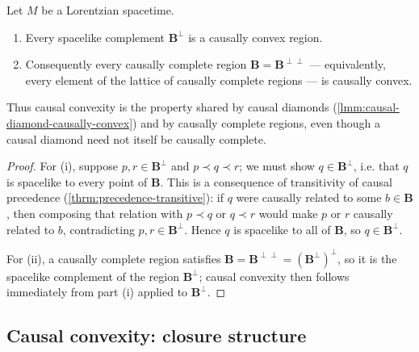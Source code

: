 \begin{theorem}
    \label{thrm:causally-complete-convex}
    \leanok
    Let $M$ be a Lorentzian spacetime.
    \begin{enumerate}
        \item Every spacelike complement $\mathbf{B}^\perp$ is a causally convex region.
        \item Consequently every causally complete region $\mathbf{B} = \mathbf{B}^{\perp\perp}$ — equivalently, every element of the lattice of causally complete regions — is causally convex.
    \end{enumerate}
    Thus causal convexity is the property shared by causal diamonds (\ref{lmm:causal-diamond-causally-convex}) and by causally complete regions, even though a causal diamond need not itself be causally complete.
\end{theorem}
\begin{proof}
    \leanok
    For (i), suppose $p, r \in \mathbf{B}^\perp$ and $p \prec q \prec r$; we must show $q \in \mathbf{B}^\perp$, i.e. that $q$ is spacelike to every point of $\mathbf{B}$. This is a consequence of transitivity of causal precedence (\ref{thrm:precedence-transitive}): if $q$ were causally related to some $b \in \mathbf{B}$, then composing that relation with $p \prec q$ or $q \prec r$ would make $p$ or $r$ causally related to $b$, contradicting $p, r \in \mathbf{B}^\perp$. Hence $q$ is spacelike to all of $\mathbf{B}$, so $q \in \mathbf{B}^\perp$.

    For (ii), a causally complete region satisfies $\mathbf{B} = \mathbf{B}^{\perp\perp} = (\mathbf{B}^\perp)^\perp$, so it is the spacelike complement of the region $\mathbf{B}^\perp$; causal convexity then follows immediately from part (i) applied to $\mathbf{B}^\perp$.
\end{proof}

\subsection{Causal convexity: closure structure}

